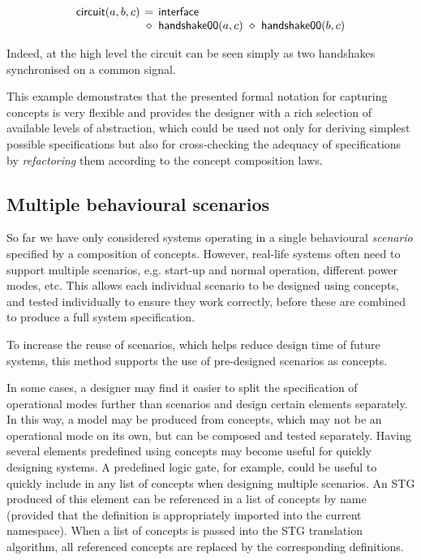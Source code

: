 \documentclass[british, journal]{IEEEtran}
\begin{document}
\vspace{-3mm}
\[
\begin{array}{lcl}
\mathsf{circuit}(a,b,c)&\hspace{-2mm}=&\hspace{-2mm}\mathsf{interface}\\
~&\hspace{-2mm}\diamond&\hspace{-2mm}\mathsf{handshake00}(a,c)~\diamond~\mathsf{handshake00}(b,c)\\
\end{array}
\]

\noindent Indeed, at the high level the circuit can be seen simply as two
handshakes synchronised on a common signal.

This example demonstrates that the presented formal notation for capturing
concepts is very flexible and provides the designer with a rich selection
of available levels of abstraction, which could be used not only for
deriving simplest possible specifications but also for cross-checking
the adequacy of specifications by \emph{refactoring} them according
to the concept composition laws.

\vspace{-1mm}
\subsection{Multiple behavioural scenarios\label{sub:scenarios}}

So far we have only considered systems operating in a single behavioural
\textit{scenario} specified by a composition of concepts. However,
real-life systems often need to support multiple scenarios, e.g. start-up
and normal operation, different power modes, etc. This allows
each individual scenario to be designed using concepts,
and tested individually to ensure they work correctly, before these
are combined to produce a full system specification.

To increase the reuse of scenarios, which helps reduce design
time of future systems, this method supports the use of pre-designed
scenarios as concepts.

In some cases, a designer may find it easier to split the specification
of operational modes further than scenarios and design certain elements
separately. In this way, a model may be produced from concepts, which
may not be an operational mode on its own, but can be composed and
tested separately. Having several elements predefined
using concepts may become useful for quickly designing systems. A
predefined logic gate, for example, could be useful to quickly include
in any list of concepts when designing multiple scenarios. An STG
produced of this element can be referenced in a list of concepts by
name (provided that the definition is appropriately imported into
the current namespace). When a list of concepts is passed into the
STG translation algorithm, all referenced concepts are replaced by
the corresponding definitions.
\end{document}
